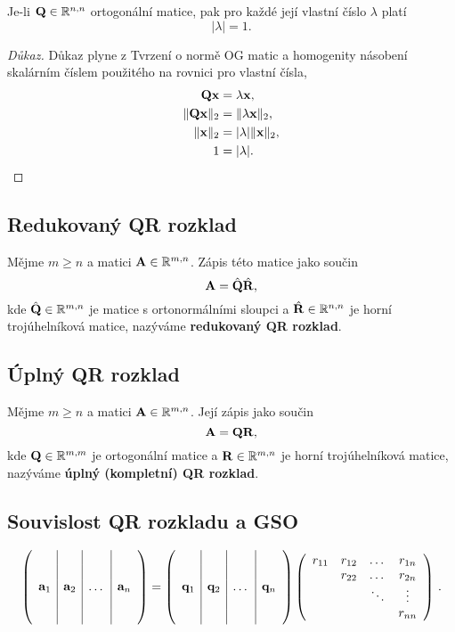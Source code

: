 Je-li $\mQ \in \R^{n,n}$ ortogonální matice, pak pro každé její vlastní číslo
$\lambda$ platí
\[ |\lambda| = 1. \]

\begin{proof}[Důkaz]
	Důkaz plyne z Tvrzení o normě OG matic a homogenity násobení skalárním číslem použitého na rovnici pro vlastní čísla,
	\begin{align*}
		\mQ \vx       & = \lambda \vx,         \\
		\|\mQ \vx\|_2 & = \|\lambda \vx\|_2,   \\
		\|\vx\|_2     & = |\lambda| \|\vx\|_2, \\
		1             & = |\lambda|.
	\end{align*}
\end{proof}

\subsection*{Redukovaný QR rozklad}

Mějme $m\geq n$ a matici $\mA \in \R^{m,n}$. Zápis této matice jako součin
\[ \mA = \hat{\mQ}\hat{\mR}, \]
kde $\hat{\mQ} \in \R^{m,n}$ je matice s ortonormálními sloupci a $\hat{\mR}
	\in \R^{n,n}$ je horní trojúhelníková matice, nazýváme \textbf{redukovaný QR
	rozklad}.

\subsection*{Úplný QR rozklad}

Mějme $m\geq n$ a matici $\mA \in \R^{m,n}$. Její zápis jako součin
\[ \mA = \mQ \mR, \]
kde $\mQ \in \R^{m,m}$ je ortogonální matice a $\mR \in \R^{m,n}$ je horní
trojúhelníková matice, nazýváme \textbf{úplný (kompletní) QR rozklad}.

\subsection*{Souvislost QR rozkladu a GSO}

\begin{equation*}
	  \pmat{c|c|c|c}{ &     &       &     \\ &     &       &     \\ \va_1 & \va_2 & \dots & \va_n \\ &     &       &     \\ &     &       & }
	=
	\pmat{c|c|c|c}{ &     &       &     \\ &     &       &     \\ \vq_1 & \vq_2 & \dots & \vq_n \\ &     &       &     \\ &     &       & }
	\pmat{cccc}{ r_{11} & r_{12} & \dots  & r_{1n} \\ & r_{22} & \dots  & r_{2n} \\ &        & \ddots & \vdots \\ &        &        & r_{nn} }\,.
\end{equation*}

